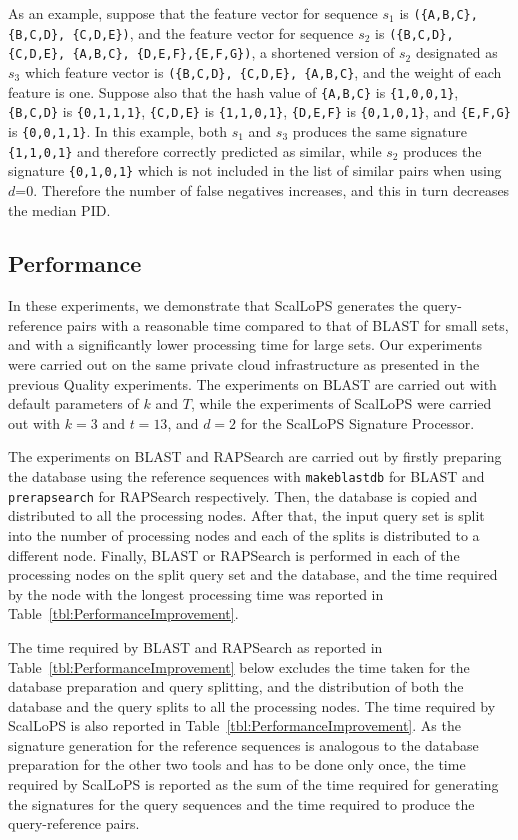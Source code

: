\documentclass[titlepage]{csetr}
\begin{document}
As an example, suppose that the feature vector for sequence \texttt{$s_1$} is \texttt{(\{A,B,C\}, \{B,C,D\}, \{C,D,E\})}, and the feature vector for sequence \texttt{$s_2$} is \texttt{(\{B,C,D\}, \{C,D,E\}, \{A,B,C\}, \{D,E,F\},\{E,F,G\})}, a shortened version of \texttt{$s_2$} designated as \texttt{$s_3$} which feature vector is \texttt{(\{B,C,D\}, \{C,D,E\}, \{A,B,C\}}, and the weight of each feature is one. Suppose also that the hash value of \texttt{\{A,B,C\}} is \texttt{\{1,0,0,1\}}, \texttt{\{B,C,D\}} is \texttt{\{0,1,1,1\}}, \texttt{\{C,D,E\}} is \texttt{\{1,1,0,1\}}, \texttt{\{D,E,F\}} is \texttt{\{0,1,0,1\}}, and \texttt{\{E,F,G\}} is \texttt{\{0,0,1,1\}}. In this example, both \texttt{$s_1$} and \texttt{$s_3$} produces the same signature \texttt{\{1,1,0,1\}} and therefore correctly predicted as similar, while \texttt{$s_2$} produces the signature \texttt{\{0,1,0,1\}} which is not included in the list of similar pairs when using $d$=0. Therefore the number of false negatives increases, and this in turn decreases the median PID.

\subsection{Performance}
In these experiments, we demonstrate that ScalLoPS generates the query-reference pairs with a reasonable time compared to that of BLAST for small sets, and with a significantly lower processing time for large sets. Our experiments were carried out on the same private cloud infrastructure as presented in the previous Quality experiments. The experiments on BLAST are carried out with default parameters of $k$ and $T$, while the experiments of ScalLoPS were carried out with $k=3$ and $t=13$, and $d=2$ for the ScalLoPS Signature Processor.

The experiments on BLAST and RAPSearch are carried out by firstly preparing the database using the reference sequences with \texttt{makeblastdb} for BLAST and \texttt{prerapsearch} for RAPSearch respectively. Then, the database is copied and distributed to all the processing nodes. After that, the input query set is split into the number of processing nodes and each of the splits is distributed to a different node. Finally, BLAST or RAPSearch is performed in each of the processing nodes on the split query set and the database, and the time required by the node with the longest processing time was reported in Table~\ref{tbl:PerformanceImprovement}.

The time required by BLAST and RAPSearch as reported in Table~\ref{tbl:PerformanceImprovement} below excludes the time taken for the database preparation and query splitting, and the distribution of both the database and the query splits to all the processing nodes. The time required by ScalLoPS is also reported in Table~\ref{tbl:PerformanceImprovement}. As the signature generation for the reference sequences is analogous to the database preparation for the other two tools and has to be done only once, the time required by ScalLoPS is reported as the sum of the time required for generating the signatures for the query sequences and the time required to produce the query-reference pairs.
\end{document}
